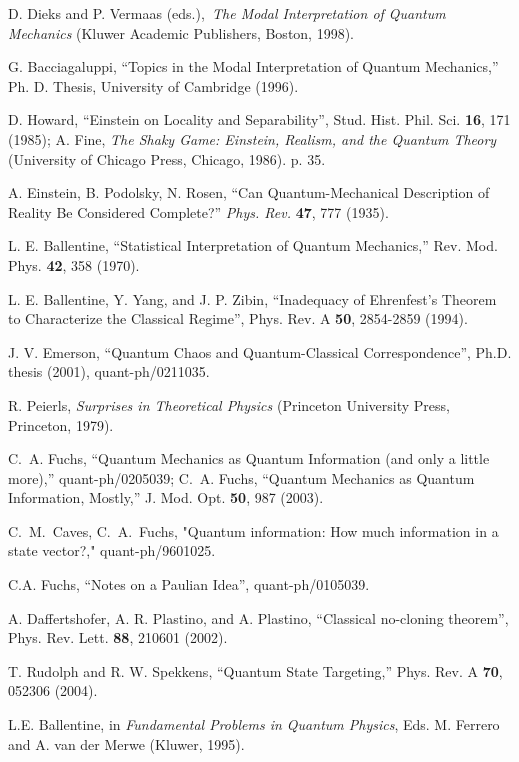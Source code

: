\documentclass[pra,twocolumn,nofootinbib,showpacs]{revtex4}
\begin{document}
\begin{thebibliography}{99}
 D. Dieks and P. Vermaas (eds.),\textit{\ The Modal
Interpretation of Quantum Mechanics }(Kluwer Academic Publishers, Boston,
1998).

 G. Bacciagaluppi, ``Topics in the Modal
Interpretation of Quantum Mechanics,'' Ph. D. Thesis, University of
Cambridge (1996).

 D. Howard, ``Einstein on Locality and
Separability'', Stud. Hist. Phil. Sci. \textbf{16}, 171 (1985); A. Fine,
\textit{The Shaky Game: Einstein, Realism, and the Quantum Theory }%
(University of Chicago Press, Chicago, 1986). p. 35.

 A. Einstein, B. Podolsky, N. Rosen, ``Can Quantum-Mechanical
Description of Reality Be Considered Complete?'' \textit{Phys. Rev.} \textbf{%
47}, 777 (1935).

 L. E. Ballentine, ``Statistical Interpretation of
Quantum Mechanics,'' Rev. Mod. Phys. \textbf{42}, 358 (1970).

 L. E. Ballentine, Y. Yang, and J. P. Zibin,
``Inadequacy of Ehrenfest's Theorem to Characterize the Classical Regime'',
Phys. Rev. A \textbf{50}, 2854-2859 (1994).

 J. V. Emerson, ``Quantum Chaos and Quantum-Classical
Correspondence'', Ph.D. thesis (2001), quant-ph/0211035.

 R. Peierls, \textit{Surprises in Theoretical Physics}
(Princeton University Press, Princeton, 1979).

 C.~A. Fuchs, ``Quantum Mechanics as Quantum Information (and
only a little more),'' quant-ph/0205039; C.~A. Fuchs, ``Quantum Mechanics as
Quantum Information, Mostly,'' J. Mod. Opt. \textbf{50}, 987 (2003).

 C.~M.~Caves, C.~A.~Fuchs, "Quantum information: How
much information in a state vector?," quant-ph/9601025.

 C.A. Fuchs, ``Notes on a Paulian Idea'',
quant-ph/0105039.

 A. Daffertshofer, A. R. Plastino, and A.
Plastino, ``Classical no-cloning theorem'', Phys. Rev. Lett.
\textbf{88}, 210601 (2002).

 T. Rudolph and R. W. Spekkens, ``Quantum State
Targeting,'' Phys. Rev. A \textbf{70}, 052306 (2004).

 L.E. Ballentine, in \textit{Fundamental Problems
in Quantum Physics}, Eds. M. Ferrero and A. van der Merwe (Kluwer, 1995).


\end{thebibliography}
\end{document}
